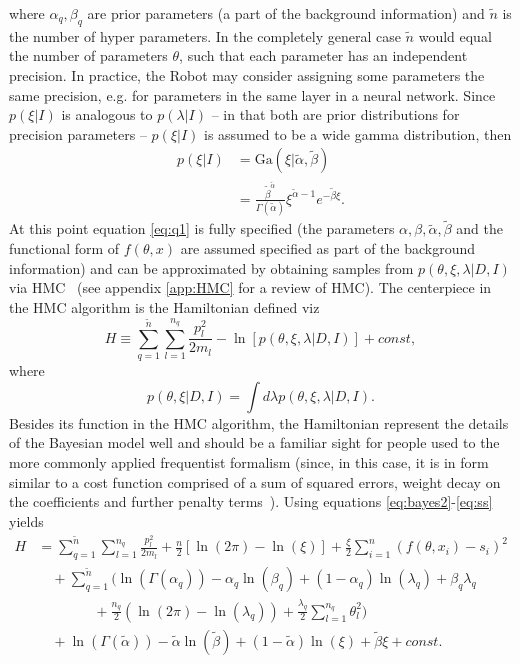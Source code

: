 where $\alpha_q,\beta_q$ are prior parameters (a part of the background information) and $\tilde{n}$ is the number of hyper parameters. In the completely general case $\tilde{n}$ would equal the number of parameters $\theta$, such that each parameter has an independent precision. In practice, the Robot may consider assigning some parameters the same precision, e.g. for parameters in the same layer in a neural network. Since $p(\xi|I)$ is analogous to $p(\lambda|I)$ -- in that both are prior distributions for precision parameters -- $p(\xi|I)$ is assumed to be a wide gamma distribution, then
\begin{equation}
	\begin{split}
		p(\xi|I) & = \text{Ga}(\xi|\tilde{\alpha},\tilde{\beta})\\
		& =\frac{\tilde{\beta}^{\tilde{\alpha}}}{\Gamma(\tilde{\alpha})}\xi^{\tilde{\alpha}-1}e^{-\tilde{\beta} \xi}.
	\end{split}
	\label{p7}
\end{equation}
At this point equation \eqref{eq:q1} is fully specified (the parameters $\alpha,\beta,\tilde{\alpha},\tilde{\beta}$ and the functional form of $f(\theta,x)$ are assumed specified as part of the background information) and can be approximated by obtaining samples from $p(\theta,\xi,\lambda|D,I)$ via HMC~\citep{Hammersley1964,Duane:1987de,Neal:1996,Neal2012} (see appendix \ref{app:HMC} for a review of HMC). The centerpiece in the HMC algorithm is the Hamiltonian defined viz~\citep{Neal:1996,Neal2012}
\begin{equation}
	H \equiv  \sum_{q=1}^{\tilde{n}}\sum_{l=1}^{n_q}\frac{p_{l}^2}{2m_{l}}-\ln[p(\theta,\xi,\lambda|D,I)]+const,
	\label{eqh}
\end{equation}
where 
\begin{equation}
	p(\theta,\xi|D,I) = \int d\lambda p(\theta,\xi,\lambda|D,I).
	\label{eq:ss}
\end{equation}
Besides its function in the HMC algorithm, the Hamiltonian represent the details of the Bayesian model well and should be a familiar sight for people used to the more commonly applied frequentist formalism (since, in this case, it is in form similar to a cost function comprised of a sum of squared errors, weight decay on the coefficients and further penalty terms~\citep{hastie_09,murphy2013machine,Goodfellow2016}). Using equations \eqref{eq:bayes2}-\eqref{eq:ss} yields
\begin{equation}
	\begin{split}
		H&=\sum_{q=1}^{\tilde{n}}\sum_{l=1}^{n_q}\frac{p_{l}^2}{2m_{l}}+\frac{n}{2}[\ln(2\pi)-\ln(\xi)] +\frac{\xi}{2}\sum_{i=1}^{n}(f(\theta,x_i)-s_i)^2\\
		&\quad+\sum_{q=1}^{\tilde{n}}\bigg(\ln(\Gamma(\alpha_q))-\alpha_q\ln(\beta_q)+(1-\alpha_q)\ln(\lambda_q)+\beta_q\lambda_q\\
		&\qquad\qquad+\frac{n_q}{2}(\ln(2\pi)-\ln(\lambda_q))+\frac{\lambda_q}{2}\sum_{l=1}^{n_q}\theta_l^2\bigg)\\
		&\quad+\ln(\Gamma(\tilde{\alpha}))-\tilde{\alpha}\ln(\tilde{\beta})+(1-\tilde{\alpha})\ln(\xi)+\tilde{\beta}\xi+const.
	\end{split}
	\label{eqh2}
\end{equation}
